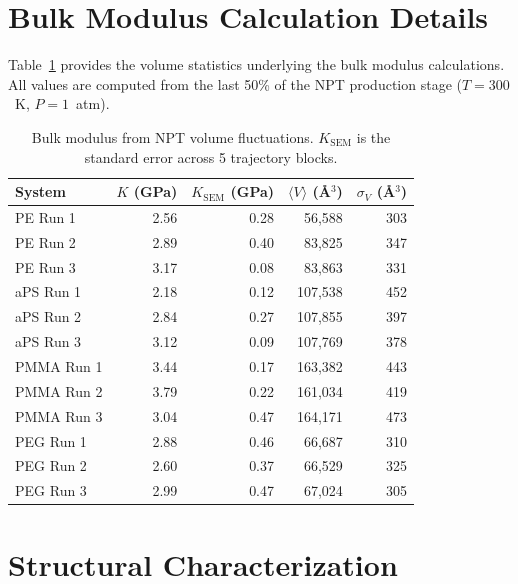 \documentclass[journal=acsami,manuscript=suppinfo]{achemso}
\begin{document}
\section{Bulk Modulus Calculation Details}
\label{sec:si_bulk_modulus}

Table~\ref{tab:si_bulk_mod_detail} provides the volume statistics underlying the bulk modulus calculations.
All values are computed from the last 50\% of the NPT production stage ($T = 300$~K, $P = 1$~atm).

\begin{table}[H]
\centering
\caption{Bulk modulus from NPT volume fluctuations.
$K_{\text{SEM}}$ is the standard error across 5 trajectory blocks.}
\label{tab:si_bulk_mod_detail}
\small
\begin{tabular}{lrrrr}
\toprule
\textbf{System} & $K$ (GPa) & $K_{\text{SEM}}$ (GPa) & $\langle V \rangle$ (\AA$^3$) & $\sigma_V$ (\AA$^3$) \\
\midrule
PE Run 1   & 2.56 & 0.28 & 56{,}588  & 303 \\
PE Run 2   & 2.89 & 0.40 & 83{,}825  & 347 \\
PE Run 3   & 3.17 & 0.08 & 83{,}863  & 331 \\
\midrule
aPS Run 1  & 2.18 & 0.12 & 107{,}538 & 452 \\
aPS Run 2  & 2.84 & 0.27 & 107{,}855 & 397 \\
aPS Run 3  & 3.12 & 0.09 & 107{,}769 & 378 \\
\midrule
PMMA Run 1 & 3.44 & 0.17 & 163{,}382 & 443 \\
PMMA Run 2 & 3.79 & 0.22 & 161{,}034 & 419 \\
PMMA Run 3 & 3.04 & 0.47 & 164{,}171 & 473 \\
\midrule
PEG Run 1  & 2.88 & 0.46 & 66{,}687  & 310 \\
PEG Run 2  & 2.60 & 0.37 & 66{,}529  & 325 \\
PEG Run 3  & 2.99 & 0.47 & 67{,}024  & 305 \\
\bottomrule
\end{tabular}
\end{table}


\section{Structural Characterization}
\label{sec:si_structural}
\end{document}
